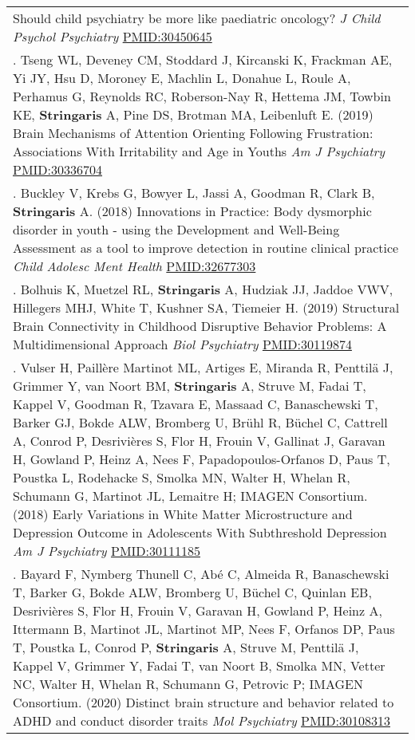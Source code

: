 \documentclass[
]{article}
\begin{document}
\begin{longtable}[]{@{}
  >{\raggedright\arraybackslash}p{}@{}}
Should child psychiatry be more like paediatric oncology? \emph{J Child
Psychol Psychiatry} \url{PMID:30450645} \\
95. Tseng WL, Deveney CM, Stoddard J, Kircanski K, Frackman AE, Yi JY,
Hsu D, Moroney E, Machlin L, Donahue L, Roule A, Perhamus G, Reynolds
RC, Roberson-Nay R, Hettema JM, Towbin KE, \textbf{Stringaris} A, Pine
DS, Brotman MA, Leibenluft E. (2019) Brain Mechanisms of Attention
Orienting Following Frustration: Associations With Irritability and Age
in Youths \emph{Am J Psychiatry} \url{PMID:30336704} \\
96. Buckley V, Krebs G, Bowyer L, Jassi A, Goodman R, Clark B,
\textbf{Stringaris} A. (2018) Innovations in Practice: Body dysmorphic
disorder in youth - using the Development and Well-Being Assessment as a
tool to improve detection in routine clinical practice \emph{Child
Adolesc Ment Health} \url{PMID:32677303} \\
97. Bolhuis K, Muetzel RL, \textbf{Stringaris} A, Hudziak JJ, Jaddoe
VWV, Hillegers MHJ, White T, Kushner SA, Tiemeier H. (2019) Structural
Brain Connectivity in Childhood Disruptive Behavior Problems: A
Multidimensional Approach \emph{Biol Psychiatry} \url{PMID:30119874} \\
98. Vulser H, Paillère Martinot ML, Artiges E, Miranda R, Penttilä J,
Grimmer Y, van Noort BM, \textbf{Stringaris} A, Struve M, Fadai T,
Kappel V, Goodman R, Tzavara E, Massaad C, Banaschewski T, Barker GJ,
Bokde ALW, Bromberg U, Brühl R, Büchel C, Cattrell A, Conrod P,
Desrivières S, Flor H, Frouin V, Gallinat J, Garavan H, Gowland P, Heinz
A, Nees F, Papadopoulos-Orfanos D, Paus T, Poustka L, Rodehacke S,
Smolka MN, Walter H, Whelan R, Schumann G, Martinot JL, Lemaitre H;
IMAGEN Consortium. (2018) Early Variations in White Matter
Microstructure and Depression Outcome in Adolescents With Subthreshold
Depression \emph{Am J Psychiatry} \url{PMID:30111185} \\
99. Bayard F, Nymberg Thunell C, Abé C, Almeida R, Banaschewski T,
Barker G, Bokde ALW, Bromberg U, Büchel C, Quinlan EB, Desrivières S,
Flor H, Frouin V, Garavan H, Gowland P, Heinz A, Ittermann B, Martinot
JL, Martinot MP, Nees F, Orfanos DP, Paus T, Poustka L, Conrod P,
\textbf{Stringaris} A, Struve M, Penttilä J, Kappel V, Grimmer Y, Fadai
T, van Noort B, Smolka MN, Vetter NC, Walter H, Whelan R, Schumann G,
Petrovic P; IMAGEN Consortium. (2020) Distinct brain structure and
behavior related to ADHD and conduct disorder traits \emph{Mol
Psychiatry} \url{PMID:30108313} \\

\end{longtable}
\end{document}
